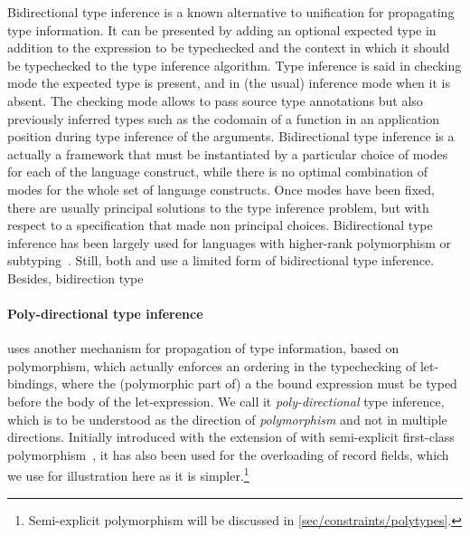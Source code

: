 \documentclass[acmsmall,screen,nonacm]{acmart}
\begin{document}
Bidirectional type inference is a known alternative to unification for
propagating type information. It can be presented by adding an optional
expected type in addition to the expression to be typechecked and the
context in which it should be typechecked to the type inference algorithm.
Type inference is said in checking mode the expected type is present, and in
(the usual) inference mode when it is absent. The checking mode allows to
pass source type annotations but also previously inferred types such as the
codomain of a function in an application position during type inference of
the arguments.
%
Bidirectional type inference is a actually a framework that must be
instantiated by a particular choice of modes for each of the language
construct, while there is no optimal combination of modes for the whole set
of language constructs. Once modes have been fixed, there are usually
principal solutions to the type inference problem, but with respect to a
specification that made non principal choices.
%
Bidirectional type inference has been largely used for languages with
higher-rank polymorphism or subtyping~. Still, both \OCaml
and \Haskell use a limited form of bidirectional type inference.
%
Besides, bidirection type 



\paragraph{Poly-directional type inference}

\OCaml uses another mechanism for propagation of type
information, based on polymorphism, which actually enforces an ordering in
the typechecking of let-bindings, where the (polymorphic part of) a the
bound expression must be typed before the body of the let-expression.  We
call it \emph{poly-directional} type inference, which is to be understood as
the direction of \emph{polymorphism} and not in multiple directions.
Initially introduced with the extension of \ML with semi-explicit
first-class polymorphism~\cite {Garrigue-Remy/poly-ml}, it has also been used
for the overloading of record fields, which we use for illustration here
as it is simpler.\footnote {Semi-explicit polymorphism will be discussed
in \cref{sec/constraints/polytypes}.}
\end{document}
